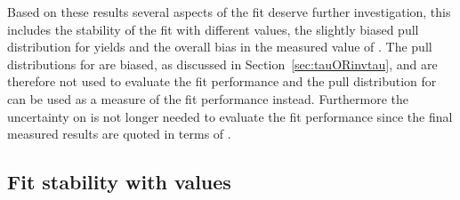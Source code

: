 Based on these results several aspects of the fit deserve further investigation, this includes the stability of the fit with different \tmumu values, the slightly biased pull distribution for \bsmumu yields and the overall bias in the measured value of \tmumu. The pull distributions for \tmumu are biased, as discussed in Section~\ref{sec:tauORinvtau}, and are therefore not used to evaluate the fit performance and the pull distribution for \Gmumu can be used as a measure of the fit performance instead. Furthermore the uncertainty on \Gmumu is not longer needed to evaluate the fit performance since the final measured results are quoted in terms of \tmumu. %

\subsection{Fit stability with \tmumu values}

